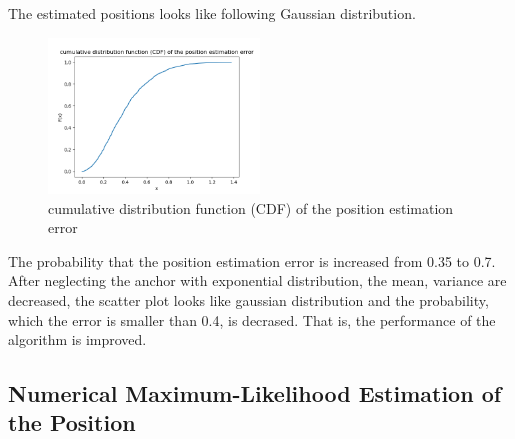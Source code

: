 \documentclass[a4paper]{article}
\begin{document}
\noindent
The estimated positions looks like following Gaussian distribution.
\begin{figure}[h]
	\begin{center}		
		\includegraphics[width=0.5\textwidth]{neglect2.png}
		\caption{cumulative distribution function (CDF) of the position estimation error}
	\end{center}
\end{figure}

The probability that the position estimation error is increased from 0.35 to 0.7.\\
After neglecting the anchor with exponential distribution, the mean, variance are decreased, the scatter plot looks like gaussian distribution and the probability, which the error is smaller than 0.4, is decrased. That is, the performance of the algorithm is improved.
\clearpage

\subsection{Numerical Maximum-Likelihood Estimation of the Position}
\end{document}
